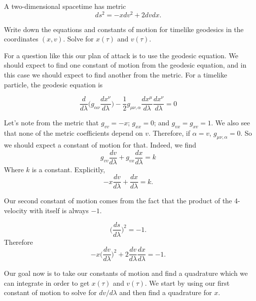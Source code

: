 \documentclass[11pt,largemargins]{homework}
\begin{document}

\question
A two-dimensional spacetime has metric
$$ ds^2 = -xdv^2 + 2dvdx. $$

\begin{alphaparts}

\questionpart
Write down the equations and constants of motion for timelike geodesics in the coordinates $(x, v)$.  Solve for $x(\tau)$ and $v(\tau).$ 

For a question like this our plan of attack is to use the geodesic equation.  We should expect to find one constant of motion from the geodesic equation, and in this case we should expect to find another from the metric.  For a timelike particle, the geodesic equation is 

\begin{equation}
\frac{d}{d\lambda} \Bigg(g_{\alpha \nu} \frac{dx^{\nu}}{d\lambda} \Bigg) - \frac{1}{2} g_{\mu \nu, \alpha} \frac{dx^{\mu}}{d\lambda} \frac{dx^{\nu}}{d\lambda} = 0
\end{equation}

Let's note from the metric that $g_{vv} = -x$; $g_{xx} = 0$; and $g_{vx} = g_{xv} = 1$. 
We also see that none of the metric coefficients depend on $v$.  Therefore, if $\alpha = v$, $g_{\mu \nu, \alpha} = 0$. So we should expect a constant of motion for that.  Indeed, we find 
$$
g_{vv} \frac{dv}{d\lambda} + g_{vx} \frac{dx}{d\lambda} = k
$$
Where $k$ is a constant.  Explicitly,
$$
-x \frac{dv}{d\lambda} + \frac{dx}{d\lambda} = k.
$$

Our second constant of motion comes from the fact that the product of the 4-velocity with itself is always $-1$.

$$
\bigg(\frac{ds}{d\lambda}\bigg)^2 = -1.
$$
Therefore
$$
-x \bigg(\frac{dv}{d\lambda}\bigg)^2 + 2 \frac{dv}{d\lambda} \frac{dx}{d\lambda} = -1.
$$

Our goal now is to take our constants of motion and find a quadrature which we can integrate in order to get $x(\tau)$ and $v(\tau)$. We start by using our first constant of motion to solve for $dv/d\lambda$ and then find a quadrature for $x$.


\end{alphaparts}
\end{document}
